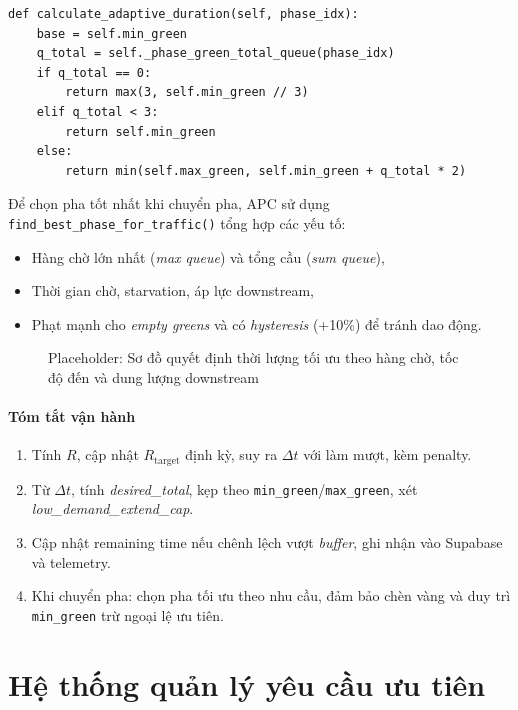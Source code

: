 \documentclass[12pt,a4paper,oneside]{report}
\begin{document}
\begin{lstlisting}[style=py, caption={Ví dụ: tính thời lượng pha theo nhu cầu}, label={lst:adaptive_duration}]
def calculate_adaptive_duration(self, phase_idx):
    base = self.min_green
    q_total = self._phase_green_total_queue(phase_idx)
    if q_total == 0:
        return max(3, self.min_green // 3)
    elif q_total < 3:
        return self.min_green
    else:
        return min(self.max_green, self.min_green + q_total * 2)
\end{lstlisting}

Để chọn pha tốt nhất khi chuyển pha, APC sử dụng \texttt{find\_best\_phase\_for\_traffic()} tổng hợp các yếu tố:
\begin{itemize}
    \item Hàng chờ lớn nhất (\emph{max queue}) và tổng cầu (\emph{sum queue}),
    \item Thời gian chờ, starvation, áp lực downstream,
    \item Phạt mạnh cho \emph{empty greens} và có \emph{hysteresis} (+10\%) để tránh dao động.
\end{itemize}

\begin{figure}[H]
    \centering
    \fbox{\rule[0pt]{0pt}{0.35\textwidth}\rule[0.8\textwidth]{0pt}{0pt}}
    \caption{Placeholder: Sơ đồ quyết định thời lượng tối ưu theo hàng chờ, tốc độ đến và dung lượng downstream}
    \label{fig:optimal_time_decision}
\end{figure}

\paragraph{Tóm tắt vận hành}
\begin{enumerate}
    \item Tính \(R\), cập nhật \(R_{\text{target}}\) định kỳ, suy ra \(\Delta t\) với làm mượt, kèm penalty.
    \item Từ \(\Delta t\), tính \emph{desired\_total}, kẹp theo \texttt{min\_green}/\texttt{max\_green}, xét \emph{low\_demand\_extend\_cap}.
    \item Cập nhật remaining time nếu chênh lệch vượt \emph{buffer}, ghi nhận vào Supabase và telemetry.
    \item Khi chuyển pha: chọn pha tối ưu theo nhu cầu, đảm bảo chèn vàng và duy trì \texttt{min\_green} trừ ngoại lệ ưu tiên.
\end{enumerate}
\section{Hệ thống quản lý yêu cầu ưu tiên}
\end{document}
